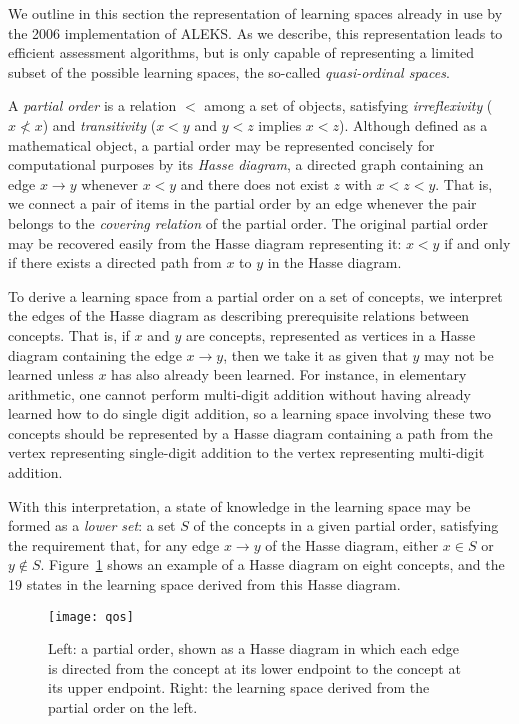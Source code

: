 \documentclass[11pt]{llncs}
\begin{document}
{We outline in this section the representation of learning spaces already in use by the 2006 implementation of ALEKS.
As we describe, this representation leads to efficient assessment algorithms, but is only capable of representing a limited subset of the possible learning spaces, the so-called \emph{quasi-ordinal spaces}.

A \emph{partial order} is a relation $<$ among a set of objects, satisfying \emph{irreflexivity} ($x\not<x$) and
\emph{transitivity} ($x<y$ and $y<z$ implies $x<z$).
Although defined as a mathematical object, a partial order may be represented concisely for computational purposes by its \emph{Hasse diagram}, a directed graph containing an edge $x\rightarrow y$ whenever $x<y$ and there does not exist $z$ with $x<z<y$. That is, we connect a pair of items in the partial order by an edge whenever the pair belongs to the \emph{covering relation} of the partial order.  The original partial order may be recovered easily from the Hasse diagram representing it: $x<y$ if and only if there exists a directed path from $x$ to $y$ in the Hasse diagram.

To derive a learning space from a partial order on a set of concepts, we interpret the edges of the Hasse diagram as describing prerequisite relations between concepts. That is, if $x$ and $y$ are concepts, represented as vertices in a Hasse diagram containing the edge $x\rightarrow y$, then we take it as given that $y$ may not be learned unless $x$ has also already been learned. For instance, in elementary arithmetic, one cannot perform multi-digit addition without having already learned how to do single digit addition, so a learning space involving these two concepts should be represented by a Hasse diagram containing a path from the vertex representing single-digit addition to the vertex representing multi-digit addition.

With this interpretation, a state of knowledge in the learning space may be formed as a \emph{lower set}: a set $S$ of the concepts in a given partial order, satisfying the requirement that, for any edge $x\rightarrow y$ of the Hasse diagram, either $x\in S$ or $y\notin S$. Figure~\ref{fig:qos} shows an example of a Hasse diagram on eight concepts, and the 19 states in the learning space derived from this Hasse diagram.

\begin{figure}[t]
\centering\texttt{[image: qos]}
\caption{Left: a partial order, shown as a Hasse diagram in which each edge is directed from the concept at its lower endpoint to the concept at its upper endpoint. Right: the learning space derived from the partial order on the left.}
\label{fig:qos}
\end{figure}

}
\end{document}
